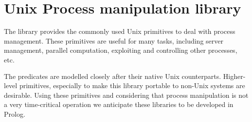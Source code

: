 \documentclass[11pt]{article}
\begin{document}
\section{Unix Process manipulation library}

The  library provides the commonly used Unix primitives to
deal with process management. These primitives are useful for many
tasks, including server management, parallel computation, exploiting and
controlling other processes, etc.

The predicates are modelled closely after their native Unix
counterparts. Higher-level primitives, especially to make this library
portable to non-Unix systems are desirable. Using these primitives and
considering that process manipulation is not a very time-critical
operation we anticipate these libraries to be developed in Prolog.
\end{document}
